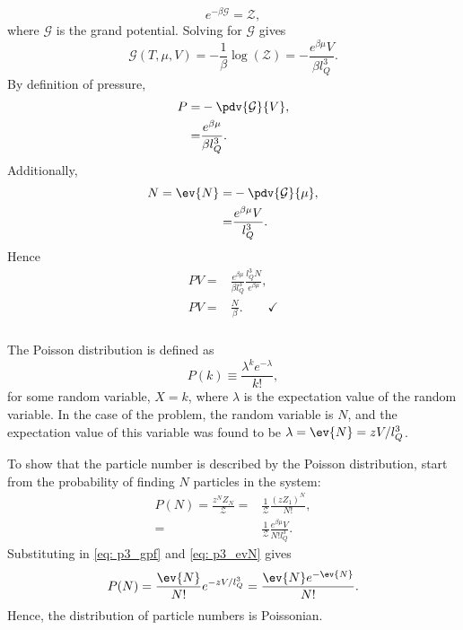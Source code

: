 \documentclass[a4paper,12pt,twoside]{article}
\begin{document}
\begin{multicols*}{2}
\subsubsection{}
\begin{equation}
	e^{-\beta \mathcal{G}} = \mathcal{Z},
\end{equation}
where $\mathcal{G}$ is the grand potential.
Solving for $\mathcal{G}$ gives
\begin{equation}
	\mathcal{G}(T,\mu,V) = -\frac{1}{\beta} \log(\mathcal{Z}) = -\frac{e^{\beta \mu}V}{\beta l_Q^3}.
\end{equation}
By definition of pressure,
\begin{align}
	P =& -\pdv{\mathcal{G}}{V},\\
	=& \frac{e^{\beta \mu}}{\beta l_Q^3}.
\end{align}
Additionally,
\begin{align}
	N = \ev{N} =& - \pdv{\mathcal{G}}{\mu},\\
	=& \frac{e^{\beta \mu}V}{l_Q^3}.\label{eq: p3_evN}
\end{align}
Hence
\begin{align}
	PV =& \frac{e^{\beta \mu}}{\beta l_Q^3}\frac{l_Q^3 N}{e^{\beta \mu}},\\
	PV =& \frac{N}{\beta}. \qquad\checkmark
\end{align}
\subsubsection{}
The Poisson distribution is defined as
\begin{equation}
	P(k) \equiv \frac{\lambda^k e^{-\lambda}}{k!},
	\label{eq: poisson}
\end{equation}
for some random variable, $X = k$, where $\lambda$ is the expectation value of the random variable.
In the case of the problem, the random variable is $N$, and the expectation value of this variable was found to be $\lambda = \ev{N} = zV/l_Q^3$.

To show that the particle number is described by the Poisson distribution, start from the probability of finding $N$ particles in the system:
\begin{align}
	P(N) = \frac{z^N Z_N}{\mathcal{Z}}
	=& \frac{1}{\mathcal{Z}} \frac{(zZ_1)^N}{N!},\\
	=& \frac{1}{\mathcal{Z}} \frac{e^{\beta\mu}V}{N! l_Q^3}.
\end{align}
Substituting in \ref{eq: p3_gpf} and \ref{eq: p3_evN} gives
\begin{equation}
	P(N) = \frac{\ev{N}}{N!}e^{-z V / l_Q^3} = \frac{\ev{N}e^{-\ev{N}}}{N!}.
\end{equation}
Hence, the distribution of particle numbers is Poissonian.

\end{multicols*}
\end{document}
